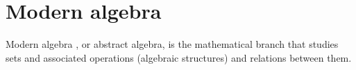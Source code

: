 \section{Modern algebra}
    Modern algebra \cite{joyce2008}, or abstract algebra, is the mathematical branch that studies sets and associated operations (algebraic structures) and relations between them.

    

    

    

    
